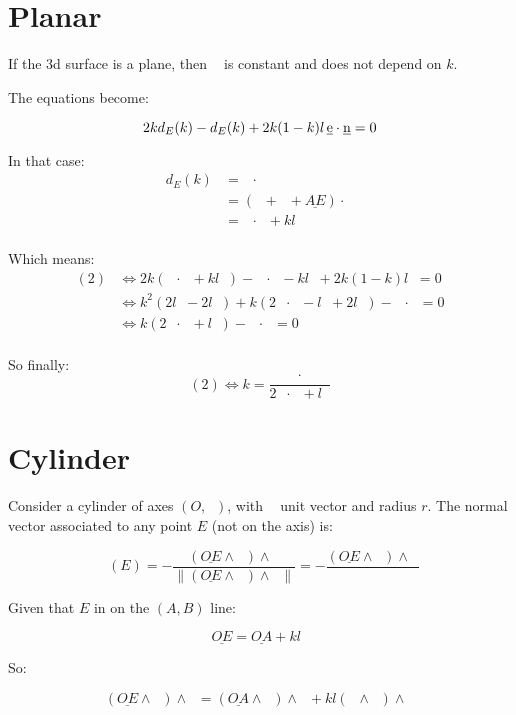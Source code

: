\documentclass[10pt,a4paper]{article}
\newcommand{\ud}[1]{\underline{#1}}
\DeclareMathOperator{\cross}{\wedge}
\DeclareMathOperator{\DE}{\ud{DE}}
\DeclareMathOperator{\DC}{\ud{DC}}
\DeclareMathOperator{\CA}{\ud{CA}}
\DeclareMathOperator{\z}{\ud{z}}
\DeclareMathOperator{\e}{\ud{e}}
\DeclareMathOperator{\n}{\ud{n}}
\DeclareMathOperator{\en}{\ud{e}\cdot\ud{n}}
\DeclareMathOperator{\OEz}{\|\ud{OE} \cross \z\|}
\begin{document}
\section{Planar}

If the 3d surface is a plane, then $\n$ is constant and does not depend on $k$.

The equations become:

\begin{equation}
    2kd_E(k) - d_E(k) + 2k(1-k)l\en = 0\\
\end{equation}

In that case:
$$
\begin{array}{ll}
    d_E(k)
    & = \DE \cdot \n\\
    & = \left( \DC + \CA + \ud{AE} \right) \cdot \n\\
    & = \CA \cdot \n + kl \en\\
\end{array}
$$

Which means:
$$
\begin{array}{ll}
    (2)
    & \Leftrightarrow
    2k(\CA \cdot \n + kl\en) - \CA \cdot \n - kl \en + 2k(1-k)l\en = 0\\
    & \Leftrightarrow
    k^2(2l\en - 2l\en) + k(2\CA \cdot \n - l\en + 2l\en) - \CA \cdot \n = 0\\
    & \Leftrightarrow
    k(2\CA \cdot \n + l\en) - \CA \cdot \n = 0\\
\end{array}
$$

So finally:
$$
(2) \Leftrightarrow k = \frac{\CA \cdot \n}{2\CA \cdot \n + l\en}
$$

\section{Cylinder}

Consider a cylinder of axes $(O, \z)$, with $\z$  unit vector and radius $r$.
The normal vector associated to any point $E$ (not on the axis) is:

$$
\n(E) = - \frac{(\ud{OE} \cross  \z) \cross \z}{
    \|(\ud{OE} \cross  \z) \cross \z\|
}
    = - \frac{(\ud{OE} \cross  \z) \cross \z}{\OEz}
$$

Given that $E$ in on the $(A, B)$ line:

$$
\ud{OE} = \ud{OA} + kl\e
$$

So:

$$
(\ud{OE} \cross \z) \cross \z
= (\ud{OA} \cross \z) \cross \z + kl( \e \cross \z )\cross \z
$$
\end{document}
